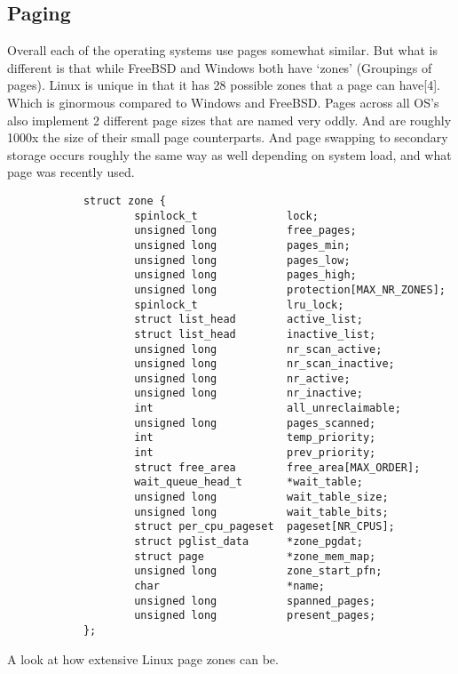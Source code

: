 \documentclass{article}
\begin{document}
\subsection{Paging}
		Overall each of the operating systems use pages somewhat similar. But what is different is that while FreeBSD and Windows both have ‘zones’ (Groupings of pages). Linux is unique in that it has 28 possible zones that a page can have[4]. Which is ginormous compared to Windows and FreeBSD. Pages across all OS’s also implement 2 different page sizes that are named very oddly. And are roughly 1000x the size of their small page counterparts. And page swapping to secondary storage occurs roughly the same way as well depending on system load, and what page was recently used.
		\begin{lstlisting}
            struct zone {
                    spinlock_t              lock;
                    unsigned long           free_pages;
                    unsigned long           pages_min;
                    unsigned long           pages_low;
                    unsigned long           pages_high;
                    unsigned long           protection[MAX_NR_ZONES];
                    spinlock_t              lru_lock;
                    struct list_head        active_list;
                    struct list_head        inactive_list;
                    unsigned long           nr_scan_active;
                    unsigned long           nr_scan_inactive;
                    unsigned long           nr_active;
                    unsigned long           nr_inactive;
                    int                     all_unreclaimable;
                    unsigned long           pages_scanned;
                    int                     temp_priority;
                    int                     prev_priority;
                    struct free_area        free_area[MAX_ORDER];
                    wait_queue_head_t       *wait_table;
                    unsigned long           wait_table_size;
                    unsigned long           wait_table_bits;
                    struct per_cpu_pageset  pageset[NR_CPUS];
                    struct pglist_data      *zone_pgdat;
                    struct page             *zone_mem_map;
                    unsigned long           zone_start_pfn;
                    char                    *name;
                    unsigned long           spanned_pages;
                    unsigned long           present_pages;
            };

		\end{lstlisting}
		A look at how extensive Linux page zones can be.
\end{document}
